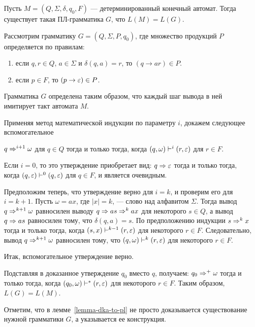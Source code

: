 \begin{mylemma} 
\label{lemma-dka-to-pl}
Пусть $M=(Q,\Sigma,\delta,q_{0},F)$ --- детерминированный конечный автомат. Тогда существует такая ПЛ-грамматика $G$, что $L(M)=L(G)$.
\end{mylemma}

\begin{myproof}
Рассмотрим грамматику $G=(Q,\Sigma,P,q_{0})$, где множество продукций $P$ определяется по правилам:
\begin{enumerate}
\item если $q,r\in Q$, $a\in\Sigma$ и $\delta(q,a)=r$, то $(q\to ar)\in P$.
\item если $p\in F$, то $(p\to\varepsilon)\in P$.
\end{enumerate}
Грамматика $G$ определена таким образом, что каждый шаг вывода в ней имитирует такт автомата $M$.

Применяя метод математической индукции по параметру $i$, докажем следующее вспомогательное

\begin{mystatement}
$q\Rightarrow^{i+1}\omega$ для $q\in Q$ тогда и только тогда, когда $(q,\omega)\vdash^i(r,\varepsilon)$ для $r\in F$.
\end{mystatement}

Если $i=0$, то это утверждение приобретает вид:	$q\Rightarrow\varepsilon$ тогда и только тогда, когда $(q,\varepsilon)\vdash^0(q,\varepsilon)$ для $q\in F$, и является очевидным.

Предположим теперь, что утверждение верно для $i=k$, и проверим его для $i=k+1$. Пусть $\omega=ax$, где $|x|=k$, --- слово над алфавитом $\Sigma$. Тогда вывод $q\Rightarrow^{k+1}\omega$ равносилен выводу $q\Rightarrow as\Rightarrow^kax$ для некоторого $s\in Q$, а вывод $q\Rightarrow as$ равносилен тому, что $\delta(q,a)=s$. По предположению индукции $s\Rightarrow^kx$ тогда и только тогда, когда $(s,x)\vdash^{k-1}(r,\varepsilon)$ для некоторого $r\in F$. Следовательно, вывод $q\Rightarrow^{k+1}\omega$ равносилен тому, что $(q,\omega)\vdash^k(r,\varepsilon)$ для некоторого $r\in F$.

Итак, вспомогательное утверждение верно.

Подставляя в доказанное утверждение $q_0$ вместо $q$, получаем: $q_0\Rightarrow^+\omega$ тогда и только тогда, когда $(q_0,\omega)\vdash^*(r,\varepsilon)$ для некоторого $r\in F$. Таким образом, $L(G)=L(M)$.
\end{myproof}

Отметим, что в лемме~\ref{lemma-dka-to-pl} не просто доказывается существование нужной грамматики $G$, а указывается ее конструкция.

